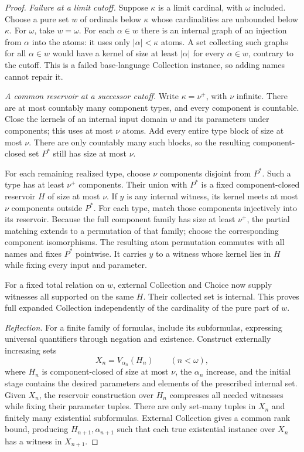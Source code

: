 \documentclass[11pt,letterpaper]{article}
\numberwithin{equation}{section}
\theoremstyle{plain}
\theoremstyle{definition}
\theoremstyle{remark}
\begin{document}
\begin{proof}
\emph{Failure at a limit cutoff.}
Suppose $\kappa$ is a limit cardinal, with $\omega$ included. Choose a pure set $w$ of ordinals below $\kappa$ whose cardinalities are unbounded below $\kappa$. For $\omega$, take $w=\omega$. For each $\alpha\in w$ there is an internal graph of an injection from $\alpha$ into the atoms: it uses only $|\alpha|<\kappa$ atoms. A set collecting such graphs for all $\alpha\in w$ would have a kernel of size at least $|\alpha|$ for every $\alpha\in w$, contrary to the cutoff. This is a failed base-language Collection instance, so adding names cannot repair it.

\emph{A common reservoir at a successor cutoff.}
Write $\kappa=\nu^+$, with $\nu$ infinite. There are at most countably many component types, and every component is countable. Close the kernels of an internal input domain $w$ and its parameters under components; this uses at most $\nu$ atoms. Add every entire type block of size at most $\nu$. There are only countably many such blocks, so the resulting component-closed set $P^*$ still has size at most $\nu$.

For each remaining realized type, choose $\nu$ components disjoint from $P^*$. Such a type has at least $\nu^+$ components. Their union with $P^*$ is a fixed component-closed reservoir $H$ of size at most $\nu$. If $y$ is any internal witness, its kernel meets at most $\nu$ components outside $P^*$. For each type, match those components injectively into its reservoir. Because the full component family has size at least $\nu^+$, the partial matching extends to a permutation of that family; choose the corresponding component isomorphisms. The resulting atom permutation commutes with all names and fixes $P^*$ pointwise. It carries $y$ to a witness whose kernel lies in $H$ while fixing every input and parameter.

For a fixed total relation on $w$, external Collection and Choice now supply witnesses all supported on the same $H$. Their collected set is internal. This proves full expanded Collection independently of the cardinality of the pure part of $w$.

\emph{Reflection.}
For a finite family of formulas, include its subformulas, expressing universal quantifiers through negation and existence. Construct externally increasing sets
\[
X_n=V_{\alpha_n}(H_n)\qquad(n<\omega),
\]
where $H_n$ is component-closed of size at most $\nu$, the $\alpha_n$ increase, and the initial stage contains the desired parameters and elements of the prescribed internal set. Given $X_n$, the reservoir construction over $H_n$ compresses all needed witnesses while fixing their parameter tuples. There are only set-many tuples in $X_n$ and finitely many existential subformulas. External Collection gives a common rank bound, producing $H_{n+1},\alpha_{n+1}$ such that each true existential instance over $X_n$ has a witness in $X_{n+1}$.


\end{proof}
\end{document}
